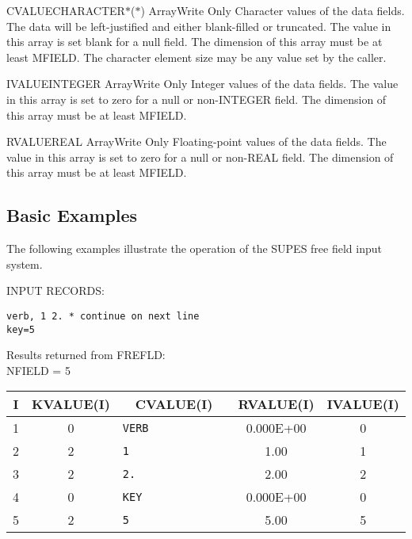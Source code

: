 \begin{argy}{CVALUE}{CHARACTER$*$($*$) Array}{Write Only}
Character values of the data fields.  The data will be
left-justified and either blank-filled or truncated.
The value in this array is set blank for a null field.
The dimension of this array must be at least MFIELD.
The character element size may be any value set by the
caller.
\end{argy}

\begin{argy}{IVALUE}{INTEGER Array}{Write Only}
Integer values of the data fields.  The value in this
array is set to zero for a null or non-INTEGER field.
The dimension of this array must be at least MFIELD.
\end{argy}

\begin{argy}{RVALUE}{REAL Array}{Write Only}
Floating-point values of the data fields.  The value in
this array is set to zero for a null or non-REAL field.
The dimension of this array must be at least MFIELD.
\end{argy}


\subsection{Basic Examples}

The following examples illustrate the operation of the SUPES free field
input system.

INPUT RECORDS:\\
\begin{verbatim}
verb, 1 2. * continue on next line
key=5
\end{verbatim}

Results returned from FREFLD:\\
NFIELD = 5

\begin{tabular}{|ccccc|} \hline \hline
I    &  KVALUE(I) &       CVALUE(I)  &        RVALUE(I)   &  IVALUE(I)\\\hline
   1   &      0 &\verb*"VERB            " & 0.000E+00 & 0\\
   2   &      2 &\verb*"1               " & 1.00     & 1\\
   3   &      2 &\verb*"2.              " & 2.00     & 2\\
   4   &      0 &\verb*"KEY             " & 0.000E+00 & 0\\
   5   &      2 &\verb*"5               " & 5.00     & 5\\ \hline \hline
\end{tabular}


